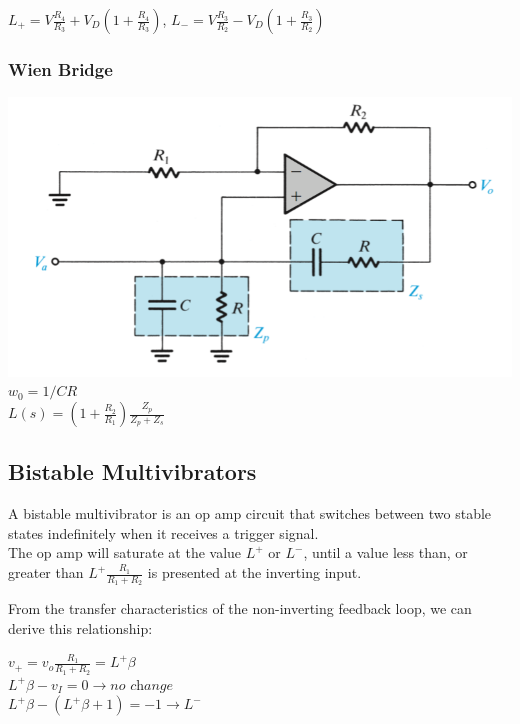 \documentclass[11pt]{article}
\begin{document}
    \begin{center}
        $L_+ = V\frac{R_4}{R_3} + V_D(1 + \frac{R_4}{R_3})$, $L_- = V\frac{R_3}{R_2} - V_D(1 + \frac{R_3}{R_2})$
    \end{center}

    \subsubsection{Wien Bridge}
    \includegraphics[width = \textwidth]{wien}
    $w_0 = 1/CR$ \\

    $L(s) = (1+\frac{R_2}{R_1})\frac{Z_p}{Z_p+Z_s}$
    
    \subsection{Bistable Multivibrators}
    A bistable multivibrator is an op amp circuit that switches between two stable states indefinitely when it receives a trigger signal. \\
    
    The op amp will saturate at the value $L^+$ or $L^-$, until a value less than, or greater than $L^+\frac{R_1}{R_1+R_2}$ is presented at the inverting input.

    From the transfer characteristics of the non-inverting feedback loop, we can derive this relationship:

    \begin{center}
        $v_+ = v_o \frac{R_1}{R_1+R_2} = L^+\beta$ \\
        
        $L^+\beta - v_I = 0 \rightarrow \textit{no change}$     \\
        
        $L^+\beta - (L^+\beta + 1) = -1 \rightarrow L^-$ \\
        
    \end{center}
\end{document}
